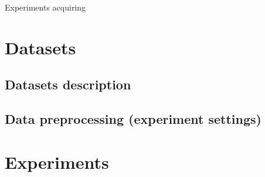 Experiments
acquiring

\section{Datasets}


\subsection{Datasets description}

\subsection{Data preprocessing (experiment settings)}


\section{Experiments}
